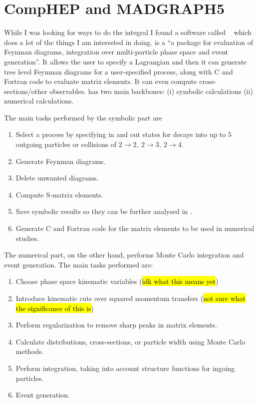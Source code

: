 \section{CompHEP and MADGRAPH5}
\label{sec:software}

\label{subsec:comphep}
\newcommand{\comphep}[1][]{\code{CompHEP}}
While I was looking for ways to do the integral I found a software called \comphep~\cite{Boos:1994xb} which does a lot of the things I am interested in doing. 
\comphep is a ``a package for evaluation of Feynman diagrams, integration over multi-particle phase space and event generation''. 
It allows the user to specify a Lagrangian and then it can generate tree level Feynman diagrams for a user-specified process, along with C and Fortran code to evaluate matrix elements. 
It can even compute cross-sections/other observables.
\comphep has two main backbones: (i) symbolic calculations (ii) numerical calculations.

The main tasks performed by the symbolic part are
\begin{enumerate}[itemsep=-2ex]
    \item Select a process by specifying in and out states for decays into up to $5$ outgoing particles or collisions of $2 \rightarrow 2, \  2 \rightarrow 3, \  2 \rightarrow 4$.
    \item Generate Feynman diagrams.
    \item Delete unwanted diagrams.
    \item Compute S-matrix elements.
    \item Save symbolic results so they can be further analysed in .
    \item Generate C and Fortran code for the matrix elements to be used in numerical studies.
\end{enumerate}

The numerical part, on the other hand, performs Monte Carlo integration and event generation. 
The main tasks performed are:
\begin{enumerate}[itemsep=-2ex]
    \item Choose phase space kinematic variables (\hl{idk what this means yet})
    \item Introduce kinematic cuts over squared momentum transfers (\hl{not sure what the significance of this is})
    \item Perform regularization to remove sharp peaks in matrix elements.
    \item Calculate distributions, cross-sections, or particle width using Monte Carlo methods.
    \item Perform integration, taking into account structure functions for ingoing particles.
    \item Event generation.
\end{enumerate}

